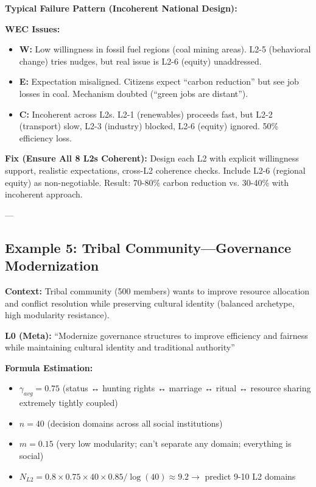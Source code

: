 \documentclass[11pt, a4paper]{article}
\begin{document}
\textbf{Typical Failure Pattern (Incoherent National Design):}

\textbf{WEC Issues:}
\begin{itemize}[nosep]
    \item \textbf{W:} Low willingness in fossil fuel regions (coal mining areas). L2-5 (behavioral change) tries nudges, but real issue is L2-6 (equity) unaddressed.
    \item \textbf{E:} Expectation misaligned. Citizens expect ``carbon reduction'' but see job losses in coal. Mechanism doubted (``green jobs are distant'').
    \item \textbf{C:} Incoherent across L2s. L2-1 (renewables) proceeds fast, but L2-2 (transport) slow, L2-3 (industry) blocked, L2-6 (equity) ignored. 50\% efficiency loss.
\end{itemize}

\textbf{Fix (Ensure All 8 L2s Coherent):} Design each L2 with explicit willingness support, realistic expectations, cross-L2 coherence checks. Include L2-6 (regional equity) as non-negotiable. Result: 70-80\% carbon reduction vs. 30-40\% with incoherent approach.

---

\subsection{Example 5: Tribal Community---Governance Modernization} \label{sec:ch15-part4f}

\textbf{Context:} Tribal community (500 members) wants to improve resource allocation and conflict resolution while preserving cultural identity (balanced archetype, high modularity resistance).

\textbf{L0 (Meta):} ``Modernize governance structures to improve efficiency and fairness while maintaining cultural identity and traditional authority''

\textbf{Formula Estimation:}
\begin{itemize}[nosep]
    \item $\gamma_{avg} = 0.75$ (status ↔ hunting rights ↔ marriage ↔ ritual ↔ resource sharing extremely tightly coupled)
    \item $n = 40$ (decision domains across all social institutions)
    \item $m = 0.15$ (very low modularity; can't separate any domain; everything is social)
    \item $N_{L2} = 0.8 \times 0.75 \times 40 \times 0.85 / \log(40) \approx 9.2 \rightarrow$ predict 9-10 L2 domains
\end{itemize}
\end{document}
